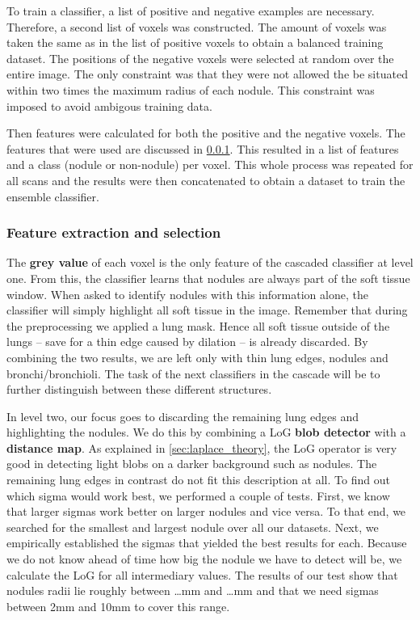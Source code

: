 To train a classifier, a list of positive and negative
examples are necessary. Therefore, a second list of voxels was constructed. The
amount of voxels was taken the same as in the list of positive voxels to obtain
a balanced training dataset. The positions of the negative voxels were selected
at random over the entire image. The only constraint was that they were not
allowed the be situated within two times the maximum radius of each nodule. This
constraint was imposed to avoid ambigous training data.

Then features were calculated for both the positive and the negative voxels. The
features that were used are discussed in \ref{sec:featureExtraction}. This
resulted in a list of features and a class (nodule or non-nodule) per voxel.
This whole process was repeated for all scans and the results were then
concatenated to obtain a dataset to train the ensemble classifier.

\subsubsection{Feature extraction and selection} \label{sec:featureExtraction}
The \textbf{grey value} of each voxel is the only feature of the cascaded
classifier at level one. From this, the classifier learns that nodules are
always part of the soft tissue window. When asked to identify nodules with this
information alone, the classifier will simply highlight all soft tissue in the
image. Remember that during the preprocessing we applied a lung mask. Hence all
soft tissue outside of the lungs -- save for a thin edge caused by dilation --
is already discarded. By combining the two results, we are left only with thin
lung edges, nodules and bronchi/bronchioli. The task of the next classifiers in
the cascade will be to further distinguish between these different structures.

In level two, our focus goes to discarding the remaining lung edges and
highlighting the nodules. We do this by combining a LoG \textbf{blob detector}
with a \textbf{distance map}. As explained in \autoref{sec:laplace_theory}, the
LoG operator is very good in detecting light blobs on a darker background such
as nodules. The remaining lung edges in contrast do not fit this description at
all. To find out which sigma would work best, we performed a couple of tests.
First, we know that larger sigmas work better on larger nodules and vice versa.
To that end, we searched for the smallest and largest nodule over all our
datasets. Next, we empirically established the sigmas that yielded the best
results for each. Because we do not know ahead of time how big the nodule we
have to detect will be, we calculate the LoG for all intermediary values. The
results of our test show that nodules radii lie roughly between \ldots mm and \ldots mm
and that we need sigmas between 2mm and 10mm to cover this range.

